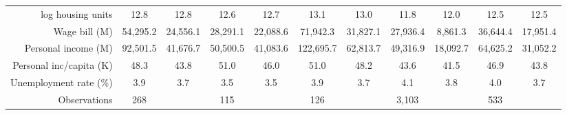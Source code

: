 \begin{tabular}{r*{5}{c}*{5}{c}}
log housing units   &        12.8&        12.8&        12.6&        12.7&        13.1&        13.0&        11.8&        12.0&        12.5&        12.5\\
Wage bill (M)       &    54,295.2&    24,556.1&    28,291.1&    22,088.6&    71,942.3&    31,827.1&    27,936.4&     8,861.3&    36,644.4&    17,951.4\\
Personal income (M) &    92,501.5&    41,676.7&    50,500.5&    41,083.6&   122,695.7&    62,813.7&    49,316.9&    18,092.7&    64,625.2&    31,052.2\\
Personal inc/capita (K)&        48.3&        43.8&        51.0&        46.0&        51.0&        48.2&        43.6&        41.5&        46.9&        43.8\\
Unemployment rate (\%)&         3.9&         3.7&         3.5&         3.5&         3.9&         3.7&         4.1&         3.8&         4.0&         3.7\\
\midrule
Observations        &         268&            &         115&            &         126&            &       3,103&            &         533&            \\
\bottomrule \end{tabular}
